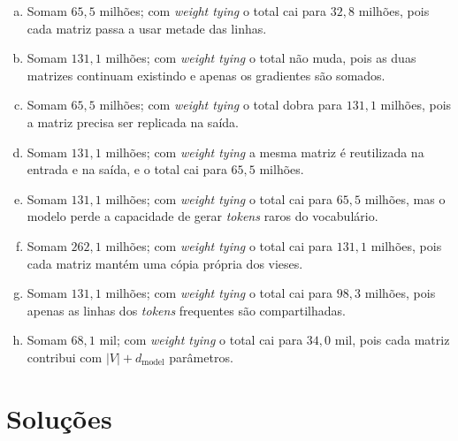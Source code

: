 \documentclass{dlproblemset}
\begin{document}
\begin{enumerate}[I)]
\begin{enumerate}[a)]
    \item Somam $65{,}5$ milhões; com \textit{weight tying} o total cai para $32{,}8$ milhões, pois cada matriz passa a usar metade das linhas.
    \item Somam $131{,}1$ milhões; com \textit{weight tying} o total não muda, pois as duas matrizes continuam existindo e apenas os gradientes são somados.
    \item Somam $65{,}5$ milhões; com \textit{weight tying} o total dobra para $131{,}1$ milhões, pois a matriz precisa ser replicada na saída.
    \item Somam $131{,}1$ milhões; com \textit{weight tying} a mesma matriz é reutilizada na entrada e na saída, e o total cai para $65{,}5$ milhões.
    \item Somam $131{,}1$ milhões; com \textit{weight tying} o total cai para $65{,}5$ milhões, mas o modelo perde a capacidade de gerar \textit{tokens} raros do vocabulário.
    \item Somam $262{,}1$ milhões; com \textit{weight tying} o total cai para $131{,}1$ milhões, pois cada matriz mantém uma cópia própria dos vieses.
    \item Somam $131{,}1$ milhões; com \textit{weight tying} o total cai para $98{,}3$ milhões, pois apenas as linhas dos \textit{tokens} frequentes são compartilhadas.
    \item Somam $68{,}1$ mil; com \textit{weight tying} o total cai para $34{,}0$ mil, pois cada matriz contribui com $|V| + d_\text{model}$ parâmetros.
\end{enumerate}

\end{enumerate}



\section*{Soluções}

\end{document}
